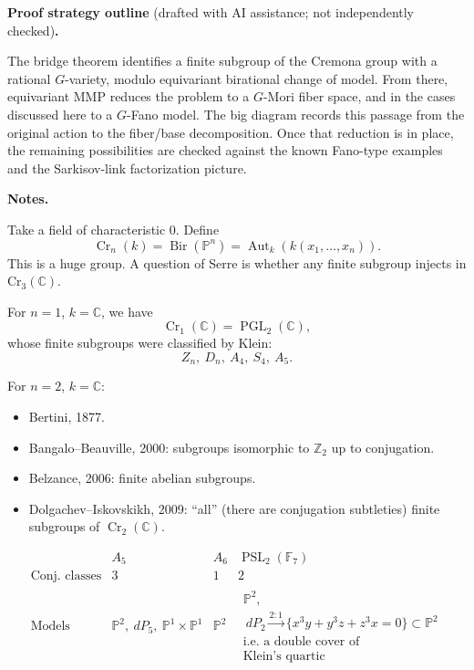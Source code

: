 \medskip\noindent
{\bf Proof strategy outline} (drafted with
AI assistance; not independently
checked){\bf .}

The bridge theorem identifies a
finite subgroup of the Cremona group
with a rational $G$-variety, modulo
equivariant birational change of
model.
From there, equivariant MMP reduces
the problem to a $G$-Mori fiber
space, and in the cases discussed
here to a $G$-Fano model.
The big diagram records this passage
from the original action to the
fiber/base decomposition.
Once that reduction is in place, the
remaining possibilities are checked
against the known Fano-type examples
and the Sarkisov-link factorization
picture.

\medskip\noindent
{\bf Notes.}

Take a field of characteristic $0$.
Define
$$
\operatorname{Cr}_n(k)
=
\operatorname{Bir}(\mathbb{P}^n)
=
\operatorname{Aut}_k
(k(x_1,\ldots,x_n)).
$$
This is a huge group.
A question of Serre is
whether any finite
subgroup injects in 
$\text{Cr}_3(\mathbb{C})$.

For $n=1$, $k=\mathbb{C}$, we have
$$
\operatorname{Cr}_1(\mathbb{C})
=
\operatorname{PGL}_2(\mathbb{C}),
$$
whose finite subgroups were
classified by Klein:
$$
Z_n,\ D_n,\ A_4,\ S_4,\ A_5.
$$

For $n=2$, $k=\mathbb{C}$:
\begin{itemize}
\item Bertini, 1877.
\item Bangalo--Beauville, 2000:
subgroups isomorphic to
$\mathbb{Z}_2$
up to conjugation.
\item
Belzance, 2006:
finite abelian subgroups.
\item Dolgachev--Iskovskikh, 2009:
``all'' (there are conjugation
subtleties) finite subgroups of
$\operatorname{Cr}_2(\mathbb{C})$.
\end{itemize}

\[
\begin{array}{c|ccc}
& A_5 & A_6 &
\operatorname{PSL}_2(\mathbb{F}_7)
\\
\hline
\text{Conj.\ classes}
& 3 & 1 & 2 \\
\text{Models}
&
\mathbb{P}^2,\ dP_5,\ \mathbb{P}^1\times
\mathbb{P}^1
&
\mathbb{P}^2
&
\substack{\mathbb{P}^2,\\ 
\ dP_2
\overset{2:1}{\to}
\{x^3y+y^3z+z^3x=0\}
\subset \mathbb{P}^2\\
\text{i.e. a double cover of}\\
\text{Klein's quartic}}
\end{array}
\]

